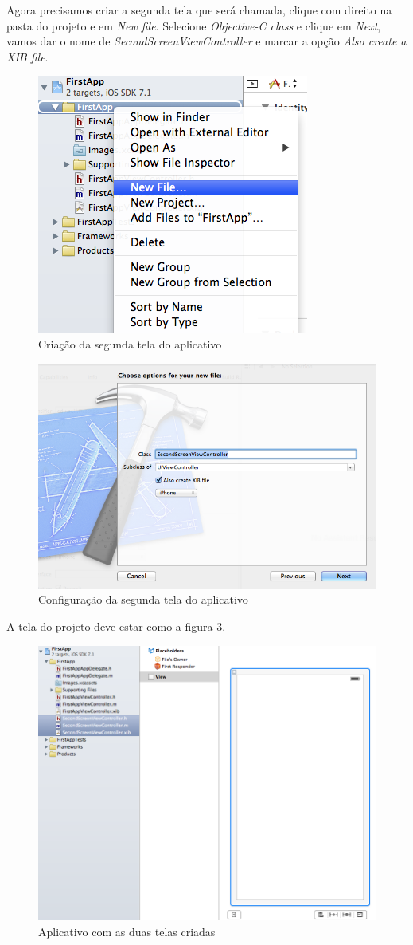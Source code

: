 \documentclass[a4paper,12pt,brazil,oneside]{book}
\begin{document}
Agora precisamos criar a segunda tela que será chamada, clique com direito na pasta do projeto e em \emph{New file}. Selecione \emph{Objective-C class} e clique em \emph{Next}, vamos dar o nome de \emph{SecondScreenViewController} e marcar a opção \emph{Also create a XIB file}.

\begin{figure}[H]
  \centering
  \includegraphics[width=.35\textwidth]{figuras/3/tela_novo_projeto_32.png}
  \caption{Criação da segunda tela do aplicativo}
  \label{fig:a}
\end{figure}

\begin{figure}[H]
  \centering
  \includegraphics[width=.75\textwidth]{figuras/3/tela_novo_projeto_33.png}
  \caption{Configuração da segunda tela do aplicativo}
  \label{fig:a}
\end{figure}


A tela do projeto deve estar como a figura \ref{fig:app_com_duas_telas}.

\begin{figure}[H]
  \centering
  \includegraphics[width=.75\textwidth]{figuras/3/tela_novo_projeto_34.png}
  \caption{Aplicativo com as duas telas criadas}
  \label{fig:app_com_duas_telas}
\end{figure}
\end{document}
